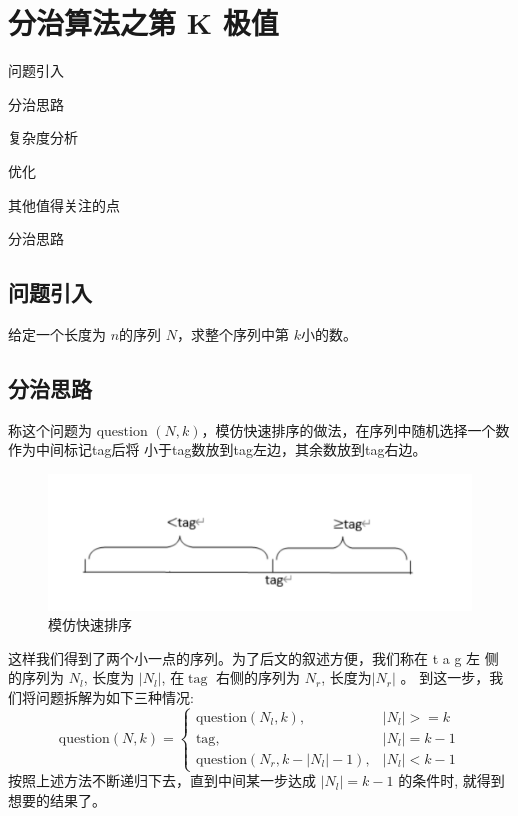 \chapter{分治算法之第 K 极值}
\begin{introduction}
	\item 问题引入
	\item 分治思路
	\item 复杂度分析
	\item 优化
	\item 其他值得关注的点
	\item 分治思路
	
\end{introduction}

\section{问题引入}
给定一个长度为 $n$的序列 $N$，求整个序列中第 $k$小的数。
\section{分治思路}
称这个问题为$\text { question }(N, k)$，模仿快速排序的做法，在序列中随机选择一个数作为中间标记tag后将
小于tag数放到tag左边，其余数放到tag右边。
\begin{figure}[htb]
	\centering
	\includegraphics[scale=0.5]{image/kth1.png}
  \caption{模仿快速排序}\label{fig:nearestpoints-divide}
\end{figure}
这样我们得到了两个小一点的序列。为了后文的叙述方便，我们称在  t a g  左 侧的序列为  $N_{l}$,  长度为  $\left|N_{l}\right|$,  在$ \operatorname{tag}$ 右侧的序列为 $N_{r}$,  长度为$  \left|N_{r}\right|$ 。
到这一步，我们将问题拆解为如下三种情况:
$$
\text {question}(N, k)=\left\{\begin{aligned}
\text {question}\left(N_{l}, k\right) ,&\left|N_{l}\right|>=k \\
\text {tag} ,&\left|N_{l}\right|=k-1 \\
\text {question}\left(N_{r}, k-\left|N_{l}\right|-1\right) ,&\left|N_{l}\right|<k-1
\end{aligned}\right.
$$
按照上述方法不断递归下去，直到中间某一步达成 $ \left|N_{l}\right|=k-1$  的条件时, 就得到想要的结果了。

